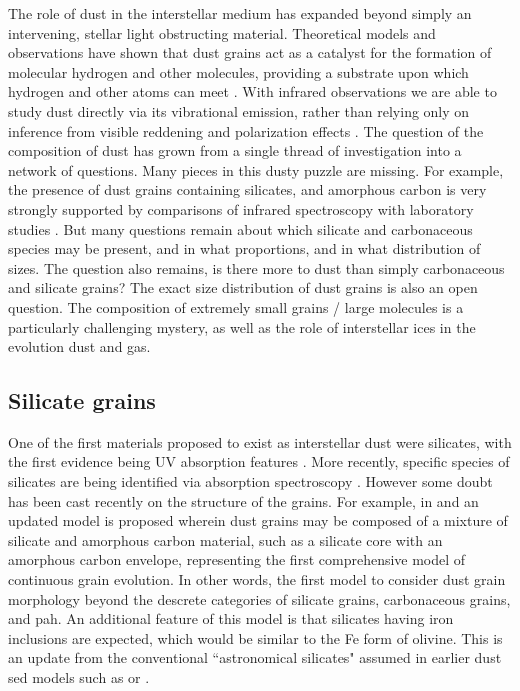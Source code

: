   The role of dust in the interstellar medium has expanded beyond simply an intervening, stellar light obstructing material. Theoretical models and observations have shown that dust grains act as a catalyst for the formation of molecular hydrogen and other molecules, providing a substrate upon which hydrogen and other atoms can meet \citep{iglesias77,burke83}. With infrared observations we are able to study dust directly via its vibrational emission, rather than relying only on inference from visible reddening and polarization effects \citep{davis51,platt56, carrasco73}.
   The question of the composition of dust has grown from a single thread of investigation into a network of questions. Many pieces in this dusty puzzle are missing. For example, the presence of dust grains containing silicates, and amorphous carbon is very strongly supported by comparisons of infrared spectroscopy with laboratory studies \citep{hagen79,joblin09}. But many questions remain about which silicate and carbonaceous species may be present, and in what proportions, and in what distribution of sizes. The question also remains, is there more to dust than simply carbonaceous and silicate grains?  The exact size distribution of dust grains is also an open question. The composition of extremely small grains / large molecules is a particularly challenging mystery, as well as the role of interstellar ices in the evolution dust and gas.

\subsection{Silicate grains}
     One of the first materials proposed to exist as interstellar dust were silicates, with the first evidence being UV absorption features \citep{knacke69}. More recently, specific species of silicates are being identified via absorption spectroscopy \citep{olofsson12}. However some doubt has been cast recently on the structure of the grains. For example, in \cite{jones13} and \cite{jones14} an updated model is proposed wherein dust grains may be composed of a mixture of silicate and amorphous carbon material, such as a silicate core with an amorphous carbon envelope, representing the first comprehensive model of continuous grain evolution. In other words, the first model to consider dust grain morphology beyond the descrete categories of silicate grains, carbonaceous grains, and \gls{pah}. An additional feature of this model is that silicates having iron inclusions are expected, which would be similar to the Fe form of olivine. This is an update from the conventional ``astronomical  silicates" assumed in earlier dust \gls{sed} models such as \cite{li01} or \cite{dustem11}.

